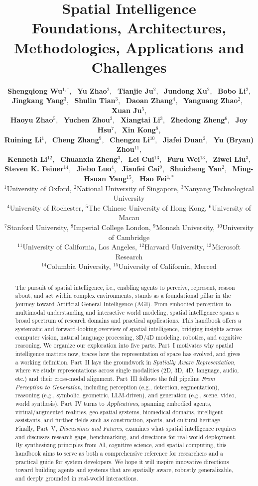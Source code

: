 \documentclass[twoside,12pt,english,openany]{book}
\title{Spatial Intelligence\\ \fontsize{12pt}{14pt}\selectfont  Foundations, Architectures, Methodologies, Applications and Challenges}
\date{}
\author{
\textbf{Shengqiong Wu}$^{1,\dagger}$, \,
\textbf{Yu Zhao}$^{2}$, \,
\textbf{Tianjie Ju}$^{2}$, \,
\textbf{Jundong Xu}$^{2}$, \,
\textbf{Bobo Li}$^{2}$, \\
\textbf{Jingkang Yang}$^{3}$, \,
\textbf{Shulin Tian}$^{3}$, \,
\textbf{Daoan Zhang}$^{4}$, \,
\textbf{Yanguang Zhao}$^{2}$, \,
\textbf{Xuan Ju}$^{5}$, \\
\textbf{Haoyu Zhao}$^{5}$, \,
\textbf{Yuchen Zhou}$^{2}$, \,
\textbf{Xiangtai Li}$^{3}$, \,
\textbf{Zhedong Zheng}$^{6}$, \,
\textbf{Joy Hsu}$^{7}$, \,
\textbf{Xin Kong}$^{8}$, \\
\textbf{Ruining Li}$^{1}$, \,
\textbf{Cheng Zhang}$^{9}$, \,
\textbf{Chengzu Li}$^{10}$, \,
\textbf{Jiafei Duan}$^{2}$, \,
\textbf{Yu (Bryan) Zhou}$^{11}$, \\
\textbf{Kenneth Li}$^{12}$, \,
\textbf{Chuanxia Zheng}$^{3}$, \,
\textbf{Lei Cui}$^{13}$, \,
\textbf{Furu Wei}$^{13}$, \,
\textbf{Ziwei Liu}$^{3}$, \\
\textbf{Steven K. Feiner}$^{14}$, \,
\textbf{Jiebo Luo}$^{4}$, \,
\textbf{Jianfei Cai}$^{9}$, \,
\textbf{Shuicheng Yan}$^{2}$, \,
\textbf{Ming-Hsuan Yang}$^{15}$, \,
\textbf{Hao Fei}$^{1,*}$
\vspace{.5em}
\\
$^{1}$University of Oxford, 
$^{2}$National University of Singapore,
$^{3}$Nanyang Technological University \\
$^{4}$University of Rochester,
$^{5}$The Chinese University of Hong Kong,
$^{6}$University of Macau\\
$^{7}$Stanford University,
$^{8}$Imperial College London,
$^{9}$Monash University,
$^{10}$University of Cambridge \\
$^{11}$University of California, Los Angeles,
$^{12}$Harvard University,
$^{13}$Microsoft Research \\
$^{14}$Columbia University,
$^{15}$University of California, Merced
}
\begin{document}
\maketitle

\vspace{-6mm}




\begin{abstract}
The pursuit of spatial intelligence, i.e., enabling agents to perceive, represent, reason about, and act within complex environments, stands as a foundational pillar in the journey toward Artificial General Intelligence (AGI). From embodied perception to multimodal understanding and interactive world modeling, spatial intelligence spans a broad spectrum of research domains and practical applications. 
This handbook offers a systematic and forward-looking overview of spatial intelligence, bridging insights across computer vision, natural language processing, 3D/4D modeling, robotics, and cognitive reasoning. We organize our exploration into five parts. Part~I motivates why spatial intelligence matters now, traces how the representation of space has evolved, and gives a working definition. Part~II lays the groundwork in \textit{Spatially Aware Representation}, where we study representations across single modalities (2D, 3D, 4D, language, audio, etc.) and their cross-modal alignment. Part~III follows the full pipeline \textit{From Perception to Generation}, including perception (e.g., detection, segmentation), reasoning (e.g., symbolic, geometric, LLM-driven), and generation (e.g., scene, video, world synthesis). Part~IV turns to \textit{Applications}, spanning embodied agents, virtual/augmented realities, geo-spatial systems, biomedical domains, intelligent assistants, and further fields such as construction, sports, and cultural heritage. Finally, Part~V, \textit{Discussions and Futures}, examines what spatial intelligence requires and discusses research gaps, benchmarking, and directions for real-world deployment.
By synthesizing principles from AI, cognitive science, and spatial computing, this handbook aims to serve as both a comprehensive reference for researchers and a practical guide for system developers. We hope it will inspire innovative directions toward building agents and systems that are spatially aware, robustly generalizable, and deeply grounded in real-world interactions.
\end{abstract}
{\renewcommand{\thefootnote}{\fnsymbol{footnote}}%
%
}
\end{document}
